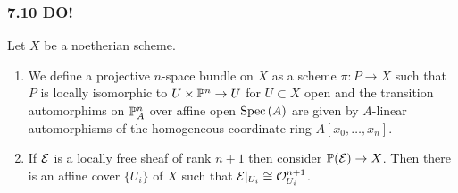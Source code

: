 \documentclass[12pt]{article}
\begin{document}
\subsubsection{7.10 DO!}

Let $X$ be a noetherian scheme. 

\begin{enumerate}
\item We define a projective $n$-space bundle on $X$ as a scheme $\pi : P \to X$ such that $P$ is locally isomorphic to $U \times \P^n \to U$ for $U \subset X$ open and the transition automorphims on $\P^n_A$ over affine open $\Spec{A}$ are given by $A$-linear automorphisms of the homogeneous coordinate ring $A[x_0, \dots, x_n]$.

\item If $\E$ is a locally free sheaf of rank $n+1$ then consider $\P(\E) \to X$. Then there is an affine cover $\{ U_i \}$ of $X$ such that $\E|_{U_i} \cong \struct{U_i}^{n+1}$.


\end{enumerate}
\end{document}
